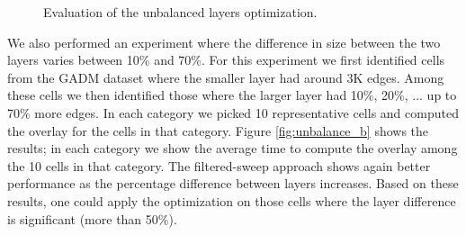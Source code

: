 \begin{figure}
    \centering
    \hspace{0.2cm}
    \caption{Evaluation of the unbalanced layers optimization.}
    \label{fig:unbalance_tests}
\end{figure}

We also performed an experiment where the difference in size between the two layers varies between 10\% and 70\%. 
For this experiment we first identified cells from the GADM dataset where the smaller layer had around 3K edges. Among these cells we then identified those where the larger layer had 10\%, 20\%, ... up to 70\% more edges. In each category we picked 10 representative cells and computed the overlay for the cells in that category.
Figure \ref{fig:unbalance_b} shows the results; in each category we show the average time to compute the overlay among the 10 cells in that category. 
The filtered-sweep approach shows again better performance as the percentage difference between layers increases. 
Based on these results, one could apply the optimization on those cells where the layer difference is significant (more than 50\%).

